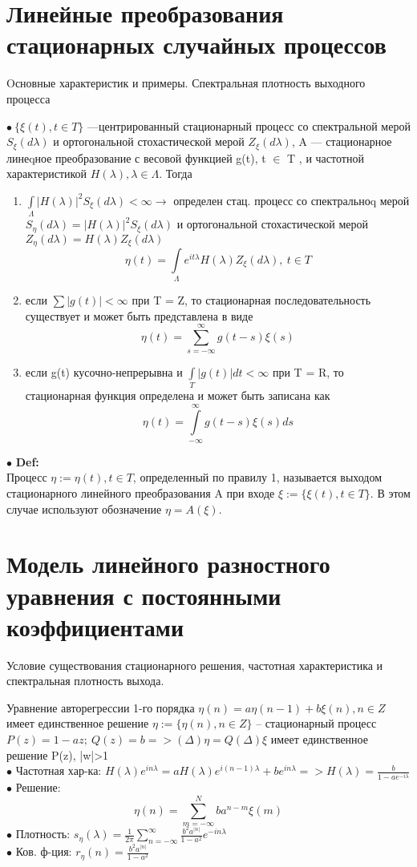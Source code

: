 \documentclass[11pt]{article}
\begin{document}
\section{Линейные преобразования стационарных случайных процессов}
\begin{center}Oсновные характеристик и примеры. Спектральная плотность выходного процесса\end{center}
$\bullet \ \{\xi(t), t \in T\}$ —центрированный стационарный процесс со спектральной мерой $S_\xi(d\lambda)$ и ортогональной стохастической мерой $Z_\xi(d\lambda)$, A — стационарное линеqное преобразование с весовой функцией g(t), t $\in$ T , и частотной характеристикой $H(\lambda),\lambda \in \Lambda$. Тогда
\begin{enumerate}
	\item $\int\limits_{\Lambda} |H(\lambda)|^2 S_\xi(d\lambda) < ∞ \longrightarrow$ определен стац. процесс со спектральноq мерой $S_\eta(d\lambda) = |H(\lambda)|^2 S_\xi(d\lambda)$ и ортогональной стохастической мерой $Z_\eta(d\lambda) = H(\lambda)Z_\xi(d\lambda)$
	$$\eta(t) =\int\limits_{\Lambda} e^{it\lambda}H(\lambda)Z_\xi(d\lambda), \ t \in T$$
	\item если $\sum |g(t)| < \infty$ при T = Z, то стационарная последовательность существует и может быть представлена в виде 
	$$\eta(t) = \sum_{s=-\infty}^{\infty} g(t − s)\xi(s) $$
	\item если g(t) кусочно-непрерывна и $\int\limits_{T}|g(t)| dt < \infty$ при T = R, то стационарная функция определена и может быть записана как
	$$\eta(t) =\int\limits_{-\infty}^{\infty} g(t − s)\xi(s)ds $$
\end{enumerate}
$\bullet$ \textbf{Def:} \\ Процесс $\eta := {\eta(t), t \in T}$, определенный по правилу 1, называется выходом стационарного линейного преобразования A при входе $\xi := \{\xi(t), t \in T\}$. В этом случае используют обозначение $\eta = A(\xi)$.


\section{Модель линейного разностного уравнения с постоянными коэффициентами}
\begin{center}Условие существования стационарного решения, частотная характеристика и спектральная плотность выхода.\end{center}

Уравнение авторегрессии 1-го порядка $\eta(n)=a \eta(n−1)+b \xi(n), n \in Z$ имеет единственное решение $\eta := \{\eta (n), n \in Z\}$ – стационарный процесс \\
$P(z) = 1 − a z;\ Q(z) = b => (\Delta)\eta = Q(\Delta)\xi$ имеет единственное решение P(z), |w|>1 \\
$\bullet$ Частотная хар-ка: $H(\lambda)e^{in\lambda} = a H(\lambda)e^{i(n−1)\lambda} + b e^{in\lambda} => H(\lambda) = \frac{b}{1-a e^{-i\lambda}}$ \\
$\bullet$ Решение: $$ \eta(n)=  \sum_{m=-\infty}^{N}ba^{n−m}\xi(m)$$
$\bullet$ Плотность: $s_\eta(\lambda) = \frac{1}{2\pi}\sum_{n=-\infty}^{\infty} \frac{b^2a^{|n|}}{1-a^2} e^{-in\lambda}$ \\
$\bullet$ Ков. ф-ция: $r_\eta(n) = \frac{b^2a^{|n|}}{1-a^2}$
\end{document}
